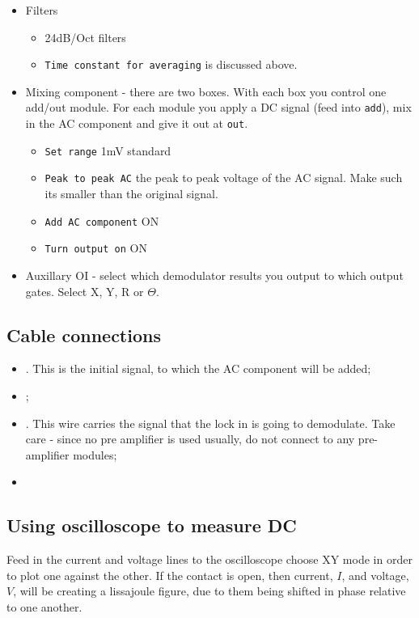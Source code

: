 \begin{itemize}
\begin{itemize}
{        field per say  every 1ns, then the lock in  will be averaging
        for far too long!}
    \end{itemize}
  \item Filters
    \begin{itemize}
    \item 24dB/Oct filters
    \item \texttt{Time constant for averaging} is discussed above.
    \end{itemize}
  \item Mixing  component - there  are two  boxes. With each  box you
    control one add/out module. For each module you apply a DC signal
    (feed into \texttt{add}), mix in the AC component and give it out
    at \texttt{out}.
    \begin{itemize}
    \item \texttt{Set range} \ira 1mV standard
    \item \texttt{Peak to  peak AC} \ira the peak to  peak voltage of
      the AC signal. Make such its smaller than the original signal.
    \item \texttt{Add AC component} \ira ON
    \item \texttt{Turn output on} \ira ON
    \end{itemize}
  \item Auxillary OI - select which demodulator results you output to
    which output gates. Select X, Y, R or $\Theta$.
  \end{itemize}

  \subsection{Cable connections}
  \begin{itemize}
  \item {}. This is the initial signal, to
    which the AC component will be added;
  \item  {};
  \item  {}. This  wire carries  the
    signal that the lock in is going to demodulate. Take care - since
    no  pre  amplifier  is  used  usually,  do  not  connect  to  any
    pre-amplifier modules;
  \item {}
  \end{itemize}

  \subsection{Using oscilloscope to measure DC}
  Feed  in the  current and  voltage lines  to the  oscilloscope \ira
  choose  XY mode  in order  to plot  one against  the other.  If the
  contact is open, then  current, $ I $, and voltage, $  V $, will be
  creating a  lissajoule figure, due  to them being shifted  in phase
  relative to one another.


  \newpage
